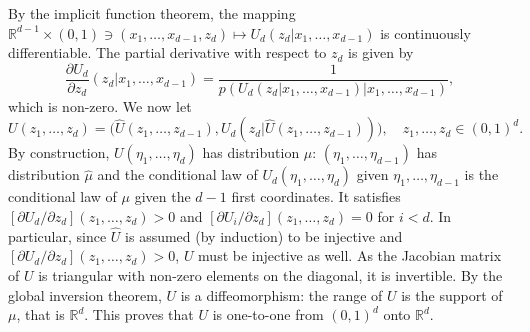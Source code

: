 \documentclass[11pt]{amsart}
\begin{document}
By the implicit function theorem, the mapping ${\mathbb R}^{d-1} \times (0,1) \ni (x_{1},\dots,x_{d-1},z_{d}) \mapsto 
U_{d}(z_{d} \vert x_{1},\dots,x_{d-1})$ is continuously differentiable. The partial derivative with respect to $z_{d}$ is given by 
\begin{equation*}
 \frac{\partial U_{d}}{\partial z_{d}}(z_{d} \vert x_{1},\dots,x_{d-1}) = \frac{1}{p( U_{d}(z_{d} \vert x_{1},\dots,x_{d-1}) \vert x_{1},\dots,x_{d-1})},
 \end{equation*}
 which is non-zero. We now let 
 \begin{equation*}
 U(z_{1},\dots,z_{d}) = \bigl( \hat{U}(z_{1},\dots,z_{d-1}), U_{d}(z_{d} \vert \hat{U}(z_{1},\dots,z_{d-1})) \bigr), \quad 
 z_{1},\dots,z_{d} \in (0,1)^d. 
 \end{equation*}
By construction, $U(\eta_{1},\dots,\eta_{d})$ has distribution $\mu$: $(\eta_{1},\dots,\eta_{d-1})$ has distribution $\hat{\mu}$ and the conditional law of $U_{d}(\eta_{1},\dots,\eta_{d})$ given $\eta_{1},\dots,\eta_{d-1}$ is the conditional law of $\mu$ given the $d-1$ first coordinates. It satisfies $[\partial U_{d}/\partial z_{d}](z_{1},\dots,z_{d}) > 0$
and $[\partial U_{i}/\partial z_{d}](z_{1},\dots,z_{d}) = 0$ for $i < d$. In particular, since $\hat{U}$ is assumed (by induction) to be injective and
$[\partial U_{d}/\partial z_{d}](z_{1},\dots,z_{d}) > 0$, $U$ must be injective as well. As the Jacobian matrix of $U$ is triangular with non-zero elements on the diagonal, it is invertible. By the global inversion theorem, $U$ is a diffeomorphism: the range of $U$ is the support of $\mu$, that is ${\mathbb R}^d$. This proves that $U$ is one-to-one from $(0,1)^d$ onto ${\mathbb R}^d$. 
\vspace{2pt}
\end{document}
